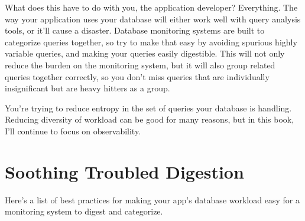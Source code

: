 \documentclass{vivid_layout}
\begin{document}
What does this have to do with you, the application developer? Everything. The
way your application uses your database will either work well with query
analysis tools, or it'll cause a disaster.  Database monitoring systems
are built to categorize queries together, so try to make that easy by avoiding
spurious highly variable queries, and making your queries easily
digestible. This will not only reduce the burden on the monitoring system, but
it will also group related queries together correctly, so you don't miss queries
that are individually insignificant but are heavy hitters as a group.

You're trying to reduce entropy in the set of queries
your database is handling. Reducing diversity of workload can be good
for many reasons, but in this book, I'll continue to focus on 
observability.

\section{Soothing Troubled Digestion}

Here's a list of best practices for making your app's
database workload easy for a monitoring system to digest and categorize.
\end{document}
